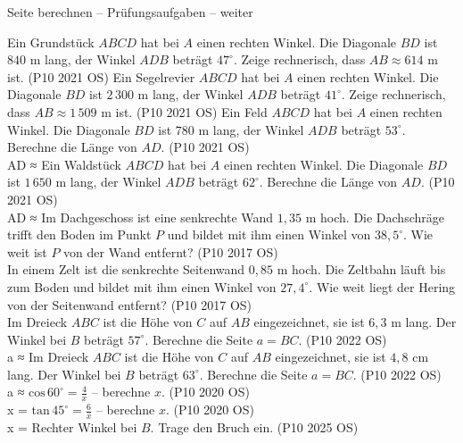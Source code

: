 \begin{aufgabe}{Seite berechnen – Prüfungsaufgaben – weiter}
\begin{teile}
\teil Ein Grundstück $ABCD$ hat bei $A$ einen rechten Winkel. Die Diagonale $BD$ ist $840$ m lang, der Winkel $ADB$ beträgt $47^\circ$. Zeige rechnerisch, dass $AB \approx 614$ m ist. \hfill (P10 2021 OS)
\teil Ein Segelrevier $ABCD$ hat bei $A$ einen rechten Winkel. Die Diagonale $BD$ ist $2\,300$ m lang, der Winkel $ADB$ beträgt $41^\circ$. Zeige rechnerisch, dass $AB \approx 1\,509$ m ist. \hfill (P10 2021 OS)
\teil Ein Feld $ABCD$ hat bei $A$ einen rechten Winkel. Die Diagonale $BD$ ist $780$ m lang, der Winkel $ADB$ beträgt $53^\circ$. Berechne die Länge von $AD$. \hfill (P10 2021 OS) \\ AD ≈ \leerfeld[m]
\teil Ein Waldstück $ABCD$ hat bei $A$ einen rechten Winkel. Die Diagonale $BD$ ist $1\,650$ m lang, der Winkel $ADB$ beträgt $62^\circ$. Berechne die Länge von $AD$. \hfill (P10 2021 OS) \\ AD ≈ \leerfeld[m]
\teil Im Dachgeschoss ist eine senkrechte Wand $1{,}35$ m hoch. Die Dachschräge trifft den Boden im Punkt $P$ und bildet mit ihm einen Winkel von $38{,}5^\circ$. Wie weit ist $P$ von der Wand entfernt? \hfill (P10 2017 OS) \\ \leerfeld[m]
\teil In einem Zelt ist die senkrechte Seitenwand $0{,}85$ m hoch. Die Zeltbahn läuft bis zum Boden und bildet mit ihm einen Winkel von $27{,}4^\circ$. Wie weit liegt der Hering von der Seitenwand entfernt? \hfill (P10 2017 OS) \\ \leerfeld[m]
\teil Im Dreieck $ABC$ ist die Höhe von $C$ auf $AB$ eingezeichnet, sie ist $6{,}3$ m lang. Der Winkel bei $B$ beträgt $57^\circ$. Berechne die Seite $a = BC$. \hfill (P10 2022 OS) \\

a ≈ \leerfeld[m]
\teil Im Dreieck $ABC$ ist die Höhe von $C$ auf $AB$ eingezeichnet, sie ist $4{,}8$ cm lang. Der Winkel bei $B$ beträgt $63^\circ$. Berechne die Seite $a = BC$. \hfill (P10 2022 OS) \\

a ≈ \leerfeld[cm]
\teil $\mathrm{cos}\,60^\circ = \frac{4}{x}$ – berechne $x$. \hfill (P10 2020 OS) \\ x = \leerfeld
\teil $\mathrm{tan}\,45^\circ = \frac{6}{x}$ – berechne $x$. \hfill (P10 2020 OS) \\ x = \leerfeld
\teil Rechter Winkel bei $B$. Trage den Bruch ein. \hfill (P10 2025 OS) \\


\end{teile}
\end{aufgabe}
